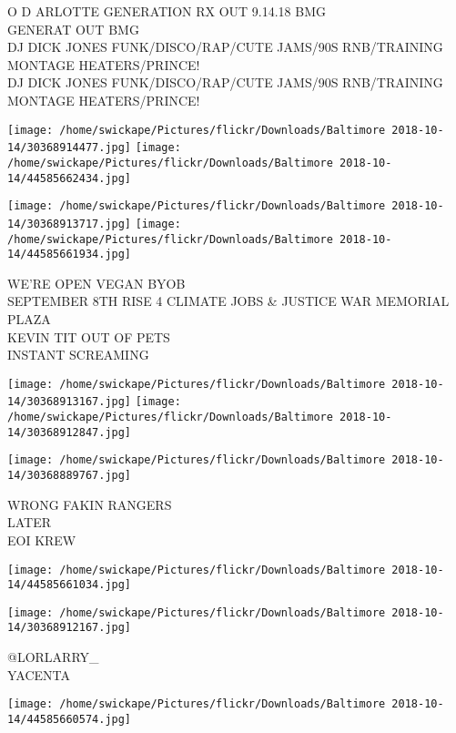\documentclass[10pt,letterpaper]{article}
\begin{document}
O D ARLOTTE GENERATION RX OUT 9.14.18 BMG\\
GENERAT OUT BMG\\
DJ DICK JONES FUNK/DISCO/RAP/CUTE JAMS/90S RNB/TRAINING MONTAGE HEATERS/PRINCE!\\
DJ DICK JONES FUNK/DISCO/RAP/CUTE JAMS/90S RNB/TRAINING MONTAGE HEATERS/PRINCE!\\
\pagebreak

\texttt{[image: /home/swickape/Pictures/flickr/Downloads/Baltimore 2018-10-14/30368914477.jpg]}
\texttt{[image: /home/swickape/Pictures/flickr/Downloads/Baltimore 2018-10-14/44585662434.jpg]}

\texttt{[image: /home/swickape/Pictures/flickr/Downloads/Baltimore 2018-10-14/30368913717.jpg]}
\texttt{[image: /home/swickape/Pictures/flickr/Downloads/Baltimore 2018-10-14/44585661934.jpg]}

WE'RE OPEN VEGAN BYOB\\
SEPTEMBER 8TH RISE 4 CLIMATE JOBS \& JUSTICE WAR MEMORIAL PLAZA\\
KEVIN TIT OUT OF PETS\\
INSTANT SCREAMING\\
\pagebreak

\texttt{[image: /home/swickape/Pictures/flickr/Downloads/Baltimore 2018-10-14/30368913167.jpg]}
\texttt{[image: /home/swickape/Pictures/flickr/Downloads/Baltimore 2018-10-14/30368912847.jpg]}

\texttt{[image: /home/swickape/Pictures/flickr/Downloads/Baltimore 2018-10-14/30368889767.jpg]}

WRONG FAKIN RANGERS\\
LATER\\
EOI KREW\\
\pagebreak

\texttt{[image: /home/swickape/Pictures/flickr/Downloads/Baltimore 2018-10-14/44585661034.jpg]}

\vspace{0.25in}
\texttt{[image: /home/swickape/Pictures/flickr/Downloads/Baltimore 2018-10-14/30368912167.jpg]}

@LORLARRY\_\\
YACENTA\\
\pagebreak

\texttt{[image: /home/swickape/Pictures/flickr/Downloads/Baltimore 2018-10-14/44585660574.jpg]}
\end{document}
